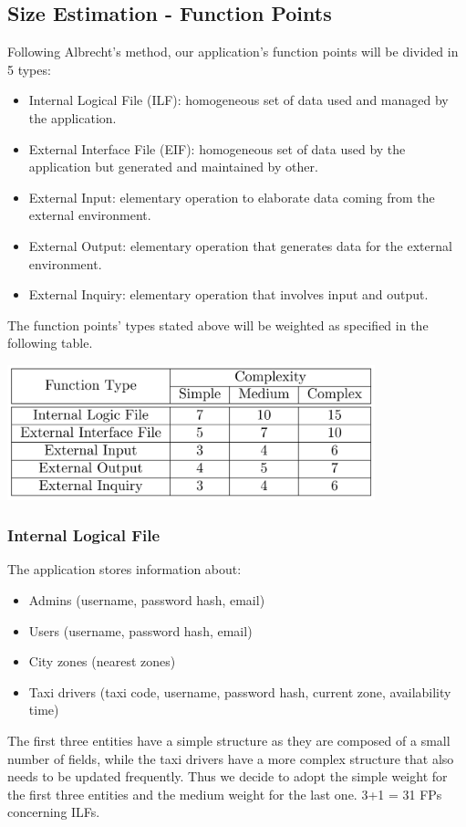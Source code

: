 \documentclass{article}
\begin{document}
\subsection{Size Estimation - Function Points}
Following Albrecht's method, our application's function points
will be divided in 5 types:
\begin{itemize}
	\item Internal Logical File (ILF): homogeneous set of data used
	and managed by the application.
	\item External Interface File (EIF): homogeneous set of data 
	used by the application but generated and maintained by other.
	\item External Input: elementary operation to elaborate data
	coming from the external environment.
	\item External Output: elementary operation that generates data
	for the external environment.
	\item External Inquiry: elementary operation that involves
	input and output.
\end{itemize}
The function points' types stated above will be weighted as 
specified in the following table.
\begin{center}
	\includegraphics[width = 0.8\textwidth]{FP}
\end{center}
\subsubsection{Internal Logical File}
The application stores information about: 
\begin{itemize}
	\item Admins (username, password hash, email)
	\item Users (username, password hash, email)
	\item City zones (nearest zones)
	\item Taxi drivers (taxi code, username, password hash, current zone, availability time)
\end{itemize}
The first three entities have a simple structure as they are composed 
of a small number of fields, while the taxi drivers have a more complex
structure that also needs to be updated frequently. Thus we decide to 
adopt the simple weight for the first three entities and the medium weight
for the last one.
3+1 = 31 FPs concerning ILFs.
\end{document}
